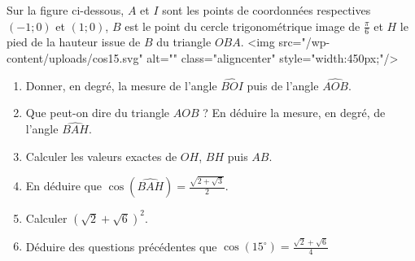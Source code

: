
%
Sur la figure ci-dessous, $A$ et $I$ sont les points de coordonnées respectives $(-1;0)$ et $(1;0)$, $B$ est le point du cercle trigonométrique image de $\frac{\pi}{6}   $ et $H$ le pied de la hauteur issue de $B$ du triangle $OBA$.
<img src="/wp-content/uploads/cos15.svg" alt="" class="aligncenter" style="width:450px;"/>

\begin{center}
\end{center}
\begin{enumerate}
     \item
     Donner, en degré, la mesure de l'angle $ \widehat{BOI} $ puis de l'angle $\widehat{AOB}$.
     \item
     Que peut-on dire du triangle $AOB$ ? En déduire la mesure, en degré, de l'angle $\widehat{BAH}$.
     \item
     Calculer les valeurs exactes de $OH$, $BH$ puis $AB$.
     \item
     En déduire que $\cos(\widehat{BAH}) = \frac{\sqrt{2+\sqrt{3}}}{2}$.
     \item
     Calculer $( \sqrt{2} +  \sqrt{6})^2  $.
     \item
     Déduire des questions précédentes que $\cos(15^{\circ})=  \frac{ \sqrt{2} +  \sqrt{6}}{4}  $
\end{enumerate}
